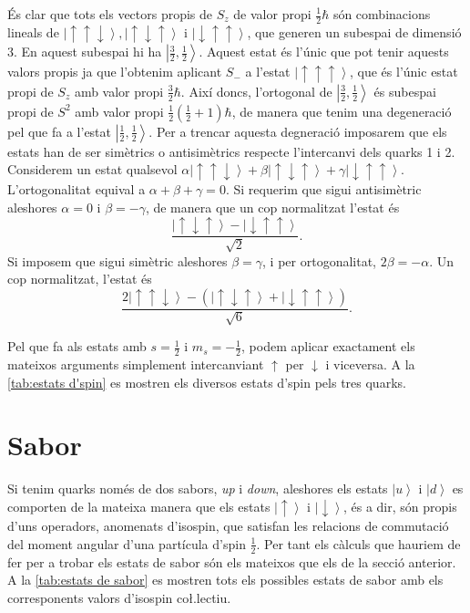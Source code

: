 \documentclass[12pt]{article}
\numberwithin{table}{section}
\numberwithin{figure}{section}
\numberwithin{equation}{section}
\renewcommand{\up}{\uparrow}
\newcommand{\down}{\downarrow}
\newcommand{\ket}[1]{\left\vert {#1} \right\rangle}
\begin{document}
És clar que tots els vectors propis de \( S_z \) de valor propi \( \frac{1}{2}\hbar \) són combinacions lineals de \( \ket{\up\up\down}, \ket{\up\down\up} \text{ i } \ket{\down\up\up} \), que generen un subespai de dimensió 3. En aquest subespai hi ha \( \ket{\frac{3}{2}, \frac{1}{2}} \). Aquest estat és l'únic que pot tenir aquests valors propis ja que l'obtenim aplicant \( S_- \) a l'estat \( \ket{\up\up\up} \), que és l'únic estat propi de \( S_z \) amb valor propi \( \frac{3}{2}\hbar \). Així doncs, l'ortogonal de \( \ket{\frac{3}{2}, \frac{1}{2}} \)  és subespai propi de \( S^2 \) amb valor propi \( \frac{1}{2}\left(\frac{1}{2} + 1\right)\hbar \), de manera que tenim una degeneració pel que fa a l'estat \( \ket{\frac{1}{2}, \frac{1}{2}} \). Per a trencar aquesta degneració imposarem que els estats han de ser simètrics o antisimètrics respecte l'intercanvi dels quarks 1 i 2. Considerem un estat qualsevol \( \alpha\ket{\up\up\down} + \beta\ket{\up\down\up} + \gamma\ket{\down\up\up} \). L'ortogonalitat equival a \( \alpha + \beta + \gamma = 0 \). Si requerim que sigui antisimètric aleshores \( \alpha = 0 \) i \( \beta = -\gamma \), de manera que un cop normalitzat l'estat és
\begin{equation*}
	\frac{\ket{\up\down\up} - \ket{\down\up\up}}{\sqrt{2}}.
\end{equation*}
Si imposem que sigui simètric aleshores \( \beta = \gamma \), i per ortogonalitat, \( 2\beta = -\alpha \). Un cop normalitzat, l'estat és
\begin{equation*}
	\frac{2\ket{\up\up\down} - (\ket{\up\down\up} + \ket{\down\up\up})}{\sqrt{6}}.
\end{equation*}

Pel que fa als estats amb \( s = \frac{1}{2} \) i \( m_s = -\frac{1}{2} \), podem aplicar exactament els mateixos arguments simplement intercanviant \( \up \) per \( \down \) i viceversa. A la \cref{tab:estats d'spin} es mostren els diversos estats d'spin pels tres quarks.


\section{Sabor}
Si tenim quarks només de dos sabors, \emph{up} i \emph{down}, aleshores els estats \( \ket{u} \) i \( \ket{d} \) es comporten de la mateixa manera que els estats \( \ket{\up} \) i \( \ket{\down} \), és a dir, són propis d'uns operadors, anomenats d'isospin, que satisfan les relacions de commutació del moment angular d'una partícula d'spin \( \frac{1}{2} \). Per tant els càlculs que hauriem de fer per a trobar els estats de sabor són els mateixos que els de la secció anterior. A la \cref{tab:estats de sabor} es mostren tots els possibles estats de sabor amb els corresponents valors d'isospin co\l.lectiu. 
\end{document}
